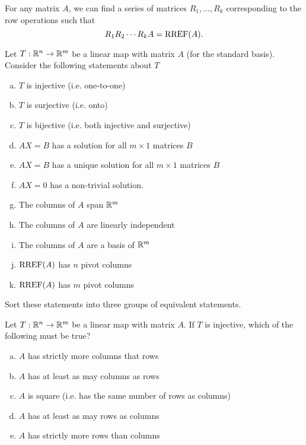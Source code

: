 \begin{applicationActivities}{2}{22}
\begin{observation}
For any matrix $A$, we can find a series of matrices $R_1, \ldots, R_k$ corresponding to the row operations such that $$R_1 R_2 \cdots R_k A = \operatorname{RREF}(A).$$
\end{observation}


\begin{activity}{15}
Let $T: \mathbb{R}^n \rightarrow \mathbb{R}^m$ be a linear map with matrix $A$ (for the standard basis).  Consider the following statements about $T$
\begin{enumerate}[(a)]
\item $T$ is injective (i.e. one-to-one)
\item $T$ is surjective (i.e. onto)
\item $T$ is bijective (i.e. both injective and surjective)
\item $AX=B$ has a solution for all $m \times 1$ matrices $B$
\item $AX=B$ has a unique solution for all $m \times 1$ matrices $B$
\item $AX=0$ has a non-trivial solution.
\item The columns of $A$ span $\mathbb{R}^m$
\item The columns of $A$ are linearly independent
\item The columns of $A$ are a basis of $\mathbb{R}^m$
\item $\operatorname{RREF}(A)$ has $n$ pivot columns
\item $\operatorname{RREF}(A)$ has $m$ pivot columns
\end{enumerate}

Sort these statements into three groups of equivalent statements.

\end{activity}

\begin{activity}{5}
Let $T: \mathbb{R}^n \rightarrow \mathbb{R}^m$ be a linear map with matrix $A$.
If $T$ is injective, which of the following must be true?
\begin{enumerate}[(a)]
\item $A$ has strictly more columns that rows
\item $A$ has at least as may columns as rows
\item $A$ is square (i.e. has the same number of rows as columns)
\item $A$ has at least as may rows as columns
\item $A$ has strictly more rows than columns
\end{enumerate}
\end{activity}


\end{applicationActivities}
